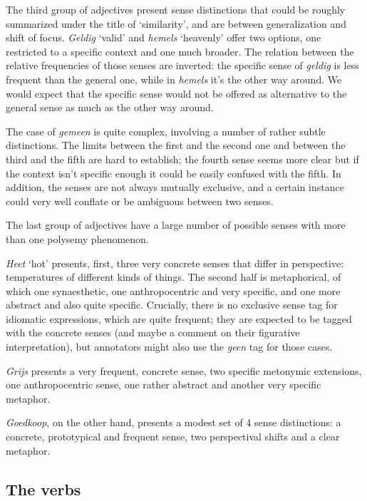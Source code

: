 \documentclass[
]{book}
\begin{document}
The third group of adjectives present sense distinctions that could be roughly summarized under the title of `similarity', and are between generalization and shift of focus.
\emph{Geldig} `valid' and \emph{hemels} `heavenly' offer two options, one restricted to a specific context and one much broader. The relation between the relative frequencies of those senses are inverted: the specific sense of \emph{geldig} is less frequent than the general one, while in \emph{hemels} it's the other way around.
We would expect that the specific sense would not be offered as alternative to the general sense as much as the other way around.

The case of \emph{gemeen} is quite complex, involving a number of rather subtle distinctions. The limits between the first and the second one and between the third and the fifth are hard to establish; the fourth sense seems more clear but if the context isn't specific enough it could be easily confused with the fifth. In addition, the senses are not always mutually exclusive, and a certain instance could very well conflate or be ambiguous between two senses.

The last group of adjectives have a large number of possible senses with more than one polysemy phenomenon.

\emph{Heet} `hot' presents, first, three very concrete senses that differ in perspective: temperatures of different kinds of things.
The second half is metaphorical, of which one synaesthetic, one anthropocentric and very specific, and one more abstract and also quite specific. Crucially, there is no exclusive sense tag for idiomatic expressions, which are quite frequent; they are expected to be tagged with the concrete senses (and maybe a comment on their figurative interpretation), but annotators might also use the \emph{geen} tag for those cases.

\emph{Grijs} presents a very frequent, concrete sense, two specific metonymic extensions, one anthropocentric sense, one rather abstract and another very specific metaphor.

\emph{Goedkoop}, on the other hand, presents a modest set of 4 sense distinctions: a concrete, prototypical and frequent sense, two perspectival shifts and a clear metaphor.

\hypertarget{verbs}{%
\subsection{The verbs}\label{verbs}}
\end{document}
